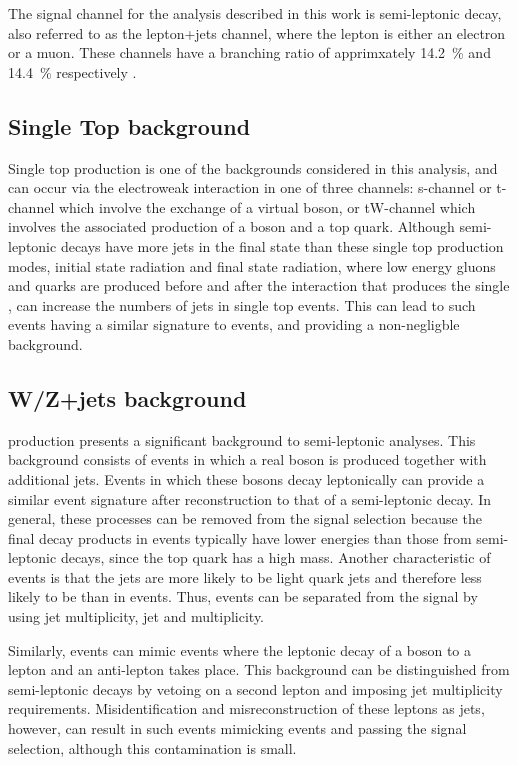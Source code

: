 The signal channel for the analysis described in this work is semi-leptonic \ttbar decay, also referred to as
the lepton+jets channel, where the lepton is either an electron or a muon. These channels have a branching
ratio of apprimxately 14.2~\% and 14.4~\% respectively \cite{Agashe:2014kda}.

\subsection{Single Top background}
\label{ss:single_top}
Single top production is one of the backgrounds considered in this analysis, and can occur via the electroweak
interaction in one of three channels: s-channel or t-channel which involve the exchange of a virtual \W boson,
or tW-channel which involves the associated production of a \W boson and a top quark. Although semi-leptonic
\ttbar decays have more jets in the final state than these single top production modes, initial state
radiation and final state radiation, where low energy gluons and quarks are produced before and after the
interaction that produces the single \tquark, can increase the numbers of jets in single top events. This can
lead to such events having a similar signature to \ttbar events, and providing a non-negligble background.

\subsection{W/Z+jets background}
\label{ss:w_z_plus_jets}
\WpJets production presents a significant background to semi-leptonic \ttbar analyses. This background
consists of events in which a real \W boson is produced together with additional jets. Events in which these
\W bosons decay leptonically can provide a similar event signature after reconstruction to that of a
semi-leptonic \ttbar decay. In general, these processes can be removed from the signal selection because the
final decay products in \WpJets events typically have lower energies than those from semi-leptonic \ttbar
decays, since the top quark has a high mass. Another characteristic of \WpJets events is that the jets are
more likely to be light quark jets and therefore less likely to be \bjets than in \ttbar events. Thus, \WpJets
events can be separated from the \ttbar signal by using jet multiplicity, jet \pt and \bjet multiplicity.

Similarly, \ZpJets events can mimic \ttbar events where the leptonic decay of a \Z boson to a lepton and an
anti-lepton takes place. This background can be distinguished from semi-leptonic \ttbar decays by
vetoing on a second lepton and imposing jet multiplicity requirements. Misidentification and misreconstruction
of these leptons as jets, however, can result in such events mimicking \ttbar events and passing the signal
selection, although this contamination is small.

